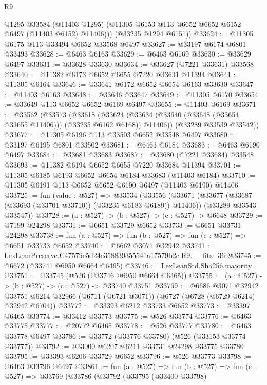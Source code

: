 \begin{lexlean}{R9}
\begin{coremodule}
          @1295
          @33584
          (@11403 @1295)
          (@11305 @6153 @113 @6652 @6652 @6152 @6497 (@11403 @6152) @11406)))
      (@33235 @1294 @6151))
@33624 := @11305 @6175 @113 @33494 @6652 @33568 @6497
@33627 := @33197 @6174 @6801 @33493
@33628 := @6463 @6163
@33629 := @6463 @6169
@33630 := @33629 @6497
@33631 := @33628 @33630
@33634 := @33627 (@7221 @33631) @33568
@33640 := @11382 @6173 @6652 @6655 @7220 @33631 @11394
@33641 := @11305 @6164
@33646 := @33641 @6172 @6652 @6654 @6163 @33630
@33647 := @11403 @6163
@33648 := @33646 @33647
@33649 := @11305 @6170
@33654 := @33649 @113 @6652 @6652 @6169 @6497
@33655 := @11403 @6169
@33671 := @33562
    (@33573
      (@33618
        (@33624 (@33634 (@33640 (@33648 (@33654 @33655 @11406))) (@33235 @6162 @6168)) @11406))
      (@33289 @33539 @33542))
@33677 := @11305 @6196 @113 @33503 @6652 @33548 @6497
@33680 := @33197 @6195 @6801 @33502
@33681 := @6463 @6184
@33683 := @6463 @6190 @6497
@33684 := @33681 @33683
@33687 := @33680 (@7221 @33684) @33548
@33693 := @11382 @6194 @6652 @6655 @7220 @33684 @11394
@33701 := @11305 @6185 @6193 @6652 @6654 @6184 @33683 (@11403 @6184)
@33710 := @11305 @6191 @113 @6652 @6652 @6190 @6497 (@11403 @6190) @11406
@33725 := fun (value : @527) =>
  @33534
    (@33556
      (@33671 (@33677 (@33687 (@33693 (@33701 @33710)) (@33235 @6183 @6189)) @11406))
      (@33289 @33543 @33547))
@33728 := (a : @527) -> (b : @527) -> (c : @527) -> @6648
@33729 := @7199 @24298
@33731 := @6651 @33729 @6652
@33733 := @6651 @33731 @24298
@33738 := fun (a : @527) => fun (b : @527) => fun (c : @527) => @6651 @33733 @6652
@33740 := @6662 @3071 @32942
@33741 := LexLeanPreserve.C47579e5d24e358839355541a17579b2c.R9.__fits_36
@33745 := @6672 (@33741 @6950 @6664 @6465)
@33746 := LexLeanStd.Sha256.majority
@33751 := @33745 (@526 (@33746 @6950 @6664 @6465))
@33755 := (a : @527) -> (b : @527) -> (c : @527) -> @33740 @33751
@33769 := @6686
    @3071
    @32942
    @33751
    @6214
    @32966
    (@6711 (@6721 @3071))
    (@6727 (@6728 (@6729 @6214) @32942 @6704))
@33772 := @33393 @6212 @33733 @6652
@33773 := @33397 @6465
@33774 := @33412 @33773
@33775 := @526 @33774
@33776 := @6463 @33775
@33777 := @20772 @6465
@33778 := @526 @33777
@33780 := @6463 @33778 @6497
@33786 := @33772 (@33776 @33780) (@526 (@33153 @33774 @33777))
@33792 := @33000 @6207 @6211 @33731 @24298 @33775 @33780
@33795 := @33393 @6206 @33729 @6652
@33796 := @526 @33773
@33798 := @6463 @33796 @6497
@33861 := fun (a : @527) =>
  fun (b : @527) =>
  fun (c : @527) =>
  @33769
    (@33786
      (@33792
        (@33795
          (@33400 @33798)

\end{coremodule}
\end{lexlean}
